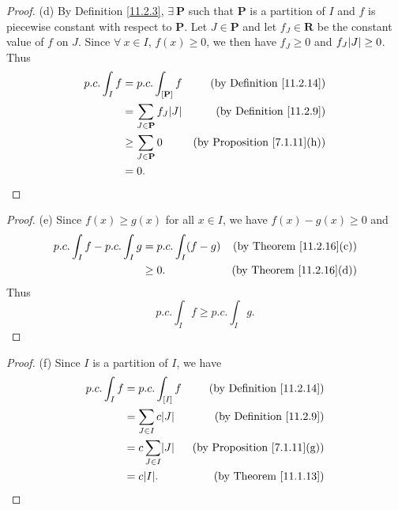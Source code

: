 \begin{proof}{(d)}
    By Definition \ref{11.2.3}, \(\exists\ \mathbf{P}\) such that \(\mathbf{P}\) is a partition of \(I\) and \(f\) is piecewise constant with respect to \(\mathbf{P}\).
    Let \(J \in \mathbf{P}\) and let \(f_J \in \mathbf{R}\) be the constant value of \(f\) on \(J\).
    Since \(\forall\ x \in I\), \(f(x) \geq 0\), we then have \(f_J \geq 0\) and \(f_J \abs*{J} \geq 0\).
    Thus
    \begin{align*}
        p.c. \int_I f & = p.c. \int_{[\mathbf{P}]} f           & \text{(by Definition \ref{11.2.14})}    \\
                      & = \sum_{J \in \mathbf{P}} f_J \abs*{J} & \text{(by Definition \ref{11.2.9})}     \\
                      & \geq \sum_{J \in \mathbf{P}} 0         & \text{(by Proposition \ref{7.1.11}(h))} \\
                      & = 0.
    \end{align*}
\end{proof}

\begin{proof}{(e)}
    Since \(f(x) \geq g(x)\) for all \(x \in I\), we have \(f(x) - g(x) \geq 0\) and
    \begin{align*}
        p.c. \int_I f - p.c. \int_I g & = p.c. \int_I (f - g) & \text{(by Theorem \ref{11.2.16}(c))} \\
                                      & \geq 0.               & \text{(by Theorem \ref{11.2.16}(d))}
    \end{align*}
    Thus
    \[
        p.c. \int_I f \geq p.c. \int_I g.
    \]
\end{proof}

\begin{proof}{(f)}
    Since \(I\) is a partition of \(I\), we have
    \begin{align*}
        p.c. \int_I f & = p.c. \int_{[I]} f         & \text{(by Definition \ref{11.2.14})}    \\
                      & = \sum_{J \in I} c \abs*{J} & \text{(by Definition \ref{11.2.9})}     \\
                      & = c \sum_{J \in I} \abs*{J} & \text{(by Proposition \ref{7.1.11}(g))} \\
                      & = c \abs*{I}.               & \text{(by Theorem \ref{11.1.13})}
    \end{align*}
\end{proof}

